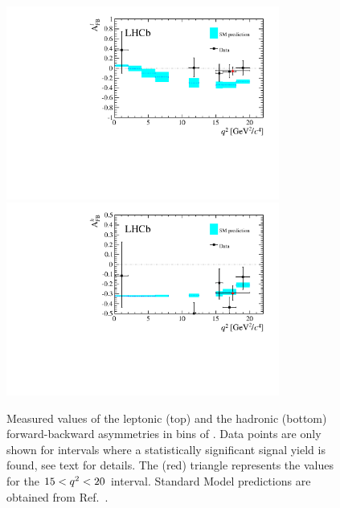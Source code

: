 \begin{figure}[ptb]
\centering
\includegraphics[width=0.8\textwidth]{Lmumu/figs/paper/figure8a.pdf}
\includegraphics[width=0.8\textwidth]{Lmumu/figs/paper/figure8b.pdf}
\caption{Measured values of the leptonic (top) and the hadronic (bottom)
  forward-backward asymmetries in bins of \qsq.
  Data points are only shown for \qsq intervals where a statistically
  significant signal yield is found, see text for details.
  The (red) triangle represents the values for the $15 < q^2 < 20$ \gevgevcccc
  interval. Standard Model predictions are obtained from Ref.~\cite{Meinel:2014wua}.}
\label{fig:Afb_results}
\end{figure}



